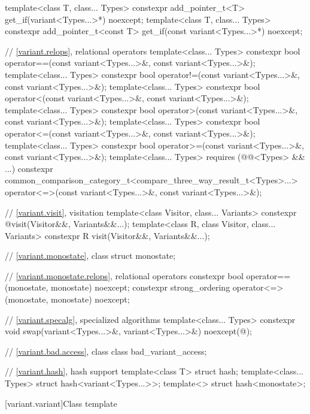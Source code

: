 \begin{codeblock}
{  template<class T, class... Types>
    constexpr add_pointer_t<T>
      get_if(variant<Types...>*) noexcept;
  template<class T, class... Types>
    constexpr add_pointer_t<const T>
      get_if(const variant<Types...>*) noexcept;

  // \ref{variant.relops}, relational operators
  template<class... Types>
    constexpr bool operator==(const variant<Types...>&, const variant<Types...>&);
  template<class... Types>
    constexpr bool operator!=(const variant<Types...>&, const variant<Types...>&);
  template<class... Types>
    constexpr bool operator<(const variant<Types...>&, const variant<Types...>&);
  template<class... Types>
    constexpr bool operator>(const variant<Types...>&, const variant<Types...>&);
  template<class... Types>
    constexpr bool operator<=(const variant<Types...>&, const variant<Types...>&);
  template<class... Types>
    constexpr bool operator>=(const variant<Types...>&, const variant<Types...>&);
  template<class... Types> requires (@@<Types> && ...)
    constexpr common_comparison_category_t<compare_three_way_result_t<Types>...>
      operator<=>(const variant<Types...>&, const variant<Types...>&);

  // \ref{variant.visit}, visitation
  template<class Visitor, class... Variants>
    constexpr @\seebelow@ visit(Visitor&&, Variants&&...);
  template<class R, class Visitor, class... Variants>
    constexpr R visit(Visitor&&, Variants&&...);

  // \ref{variant.monostate}, class 
  struct monostate;

  // \ref{variant.monostate.relops},  relational operators
  constexpr bool operator==(monostate, monostate) noexcept;
  constexpr strong_ordering operator<=>(monostate, monostate) noexcept;

  // \ref{variant.specalg}, specialized algorithms
  template<class... Types>
    constexpr void swap(variant<Types...>&, variant<Types...>&) noexcept(@\seebelow@);

  // \ref{variant.bad.access}, class 
  class bad_variant_access;

  // \ref{variant.hash}, hash support
  template<class T> struct hash;
  template<class... Types> struct hash<variant<Types...>>;
  template<> struct hash<monostate>;
}
\end{codeblock}

[variant.variant]{Class template }%
%

